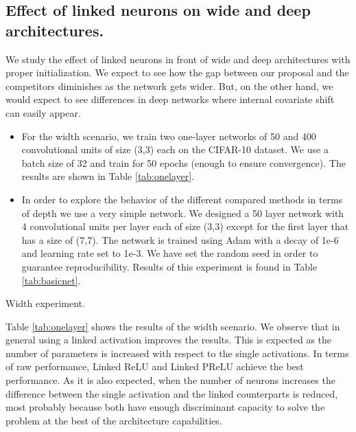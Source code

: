 \documentclass[10pt,twocolumn,letterpaper]{article}
\begin{document}
\subsection{Effect of linked neurons on wide and deep architectures.}

We study the effect of linked neurons in front of wide and deep architectures with proper initialization. We expect to see how the gap between our proposal and the competitors diminishes as the network gets wider. But, on the other hand, we would expect to see differences in deep networks where internal covariate shift can easily appear. 

\begin{itemize}
    \item For the width scenario, we train two one-layer networks of 50 and 400 convolutional units of size (3,3) each on the CIFAR-10 dataset. We use a batch size of 32 and train for 50 epochs (enough to ensure convergence). The results are shown in Table \ref{tab:onelayer}. 
    \item In order to explore the behavior of the different compared methods in terms of depth we use a very simple network. We designed a 50 layer network with 4 convolutional units per layer each of size (3,3) except for the first layer that has a size of (7,7). The network is trained using Adam \cite{adam} with a decay of 1e-6 and learning rate set to 1e-3. We have set the random seed in order to guarantee reproducibility. Results of this experiment is found in Table \ref{tab:basicnet}.
\end{itemize}

\begin{table}[h]
    \centering
    
    
    
    \caption{Width experiment.}
    \label{tab:onelayer}
\end{table}

Table \ref{tab:onelayer} shows the results of the width scenario. We observe that in general using a linked activation improves the results. This is expected as the number of parameters is increased with respect to the single activations. In terms of raw performance, Linked ReLU and Linked PReLU achieve the best performance. As it is also expected, when the number of neurons increases the difference between the single activation and the linked counterparts is reduced, most probably because both have enough discriminant capacity to solve the problem at the best of the architecture capabilities.
\end{document}
